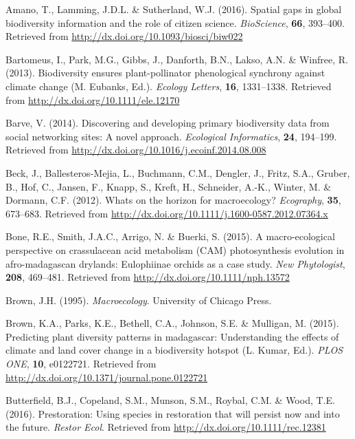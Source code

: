 \documentclass[3p]{elsarticle} %
\newlength{\cslhangindent}
\newenvironment{cslreferences}%
  {\setlength{\parindent}{0pt}%
  \everypar{\setlength{\hangindent}{\cslhangindent}}\ignorespaces}%
  {\par}
\begin{document}
\hypertarget{refs}{}
\begin{cslreferences}
\leavevmode\hypertarget{ref-Amano_2016}{}%
Amano, T., Lamming, J.D.L. \& Sutherland, W.J. (2016). Spatial gaps in
global biodiversity information and the role of citizen science.
\emph{BioScience}, \textbf{66}, 393--400. Retrieved from
\url{http://dx.doi.org/10.1093/biosci/biw022}

\leavevmode\hypertarget{ref-Bartomeus_2013}{}%
Bartomeus, I., Park, M.G., Gibbs, J., Danforth, B.N., Lakso, A.N. \&
Winfree, R. (2013). Biodiversity ensures plant-pollinator phenological
synchrony against climate change (M. Eubanks, Ed.). \emph{Ecology
Letters}, \textbf{16}, 1331--1338. Retrieved from
\url{http://dx.doi.org/10.1111/ele.12170}

\leavevmode\hypertarget{ref-Barve_2014}{}%
Barve, V. (2014). Discovering and developing primary biodiversity data
from social networking sites: A novel approach. \emph{Ecological
Informatics}, \textbf{24}, 194--199. Retrieved from
\url{http://dx.doi.org/10.1016/j.ecoinf.2014.08.008}

\leavevmode\hypertarget{ref-Beck_2012}{}%
Beck, J., Ballesteros-Mejia, L., Buchmann, C.M., Dengler, J., Fritz,
S.A., Gruber, B., Hof, C., Jansen, F., Knapp, S., Kreft, H., Schneider,
A.-K., Winter, M. \& Dormann, C.F. (2012). Whats on the horizon for
macroecology? \emph{Ecography}, \textbf{35}, 673--683. Retrieved from
\url{http://dx.doi.org/10.1111/j.1600-0587.2012.07364.x}

\leavevmode\hypertarget{ref-Bone_2015}{}%
Bone, R.E., Smith, J.A.C., Arrigo, N. \& Buerki, S. (2015). A
macro-ecological perspective on crassulacean acid metabolism (CAM)
photosynthesis evolution in afro-madagascan drylands: Eulophiinae
orchids as a case study. \emph{New Phytologist}, \textbf{208}, 469--481.
Retrieved from \url{http://dx.doi.org/10.1111/nph.13572}

\leavevmode\hypertarget{ref-Brown_1995}{}%
Brown, J.H. (1995). \emph{Macroecology}. University of Chicago Press.

\leavevmode\hypertarget{ref-Brown_2015}{}%
Brown, K.A., Parks, K.E., Bethell, C.A., Johnson, S.E. \& Mulligan, M.
(2015). Predicting plant diversity patterns in madagascar: Understanding
the effects of climate and land cover change in a biodiversity hotspot
(L. Kumar, Ed.). \emph{PLOS ONE}, \textbf{10}, e0122721. Retrieved from
\url{http://dx.doi.org/10.1371/journal.pone.0122721}

\leavevmode\hypertarget{ref-Butterfield_2016}{}%
Butterfield, B.J., Copeland, S.M., Munson, S.M., Roybal, C.M. \& Wood,
T.E. (2016). Prestoration: Using species in restoration that will
persist now and into the future. \emph{Restor Ecol}. Retrieved from
\url{http://dx.doi.org/10.1111/rec.12381}


\end{cslreferences}
\end{document}
